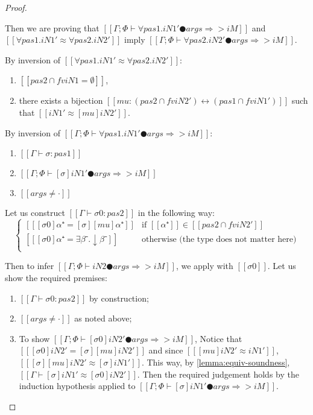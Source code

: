 \begin{proof}
\begin{caseof}
        \item {}
            Then we are proving that 
            $[[Γ ; Φ ⊢ ∀pas1.iN1' ● args ⇒> iM]]$ and $[[∀pas1.iN1' ≈ ∀pas2.iN2']]$
            imply $[[Γ ; Φ ⊢ ∀pas2.iN2' ● args ⇒> iM]]$.


            By inversion of $[[∀pas1.iN1' ≈ ∀pas2.iN2']]$:
            \begin{enumerate}
                \item $[[{pas2} ∩ fv iN1 = ∅]]$,
                \item there exists a bijection 
                    $[[mu : ({pas2} ∩ fv iN2') ↔ ({pas1} ∩ fv iN1')]]$
                    such that $[[iN1' ≈ [mu] iN2']]$.
            \end{enumerate}

            By inversion of $[[Γ ; Φ ⊢ ∀pas1.iN1' ● args ⇒> iM]]$:
            \begin{enumerate}
                \item $[[Γ ⊢ σ :{pas1}]]$        
                \item $[[Γ ; Φ ⊢ [σ]iN1' ● args ⇒> iM]]$
                \item $[[args ≠ ·]]$
            \end{enumerate}

            Let us construct $[[Γ ⊢ σ0 :{pas2}]]$ in the following way:
            $$
            \begin{cases}
                [[ [σ0]α⁺ =  [σ][mu]α⁺ ]] & \text{if } [[α⁺]] \in [[ {pas2} ∩ fv iN2' ]] \\
                [[ [σ0]α⁺ =  ∃β⁻.↓β⁻ ]] & \text{otherwise (the type does not matter here)} \\
            \end{cases}
            $$

            Then to infer $[[Γ ; Φ ⊢ iN2 ● args ⇒> iM]]$, we 
            apply  with $[[σ0]]$. 
            Let us show the required premises:
            \begin{enumerate}
                \item $[[Γ ⊢ σ0 :{pas2}]]$ by construction;
                \item $[[args ≠ ·]]$ as noted above;
                \item To show $[[Γ ; Φ ⊢ [σ0]iN2' ● args ⇒> iM]]$,
                Notice that $[[ [σ0]iN2' = [σ][mu]iN2' ]]$   
                and since $[[ [mu]iN2' ≈ iN1' ]]$, $[[ [σ][mu]iN2' ≈ [σ]iN1' ]]$.
                This way, by \cref{lemma:equiv-soundness}, $[[Γ ⊢ [σ]iN1' ≈ [σ0]iN2']]$.
                Then the required judgement holds by the induction hypothesis
                applied to $[[Γ ; Φ ⊢ [σ]iN1' ● args ⇒> iM]]$.
            \end{enumerate}
    \end{caseof}
\end{proof}

